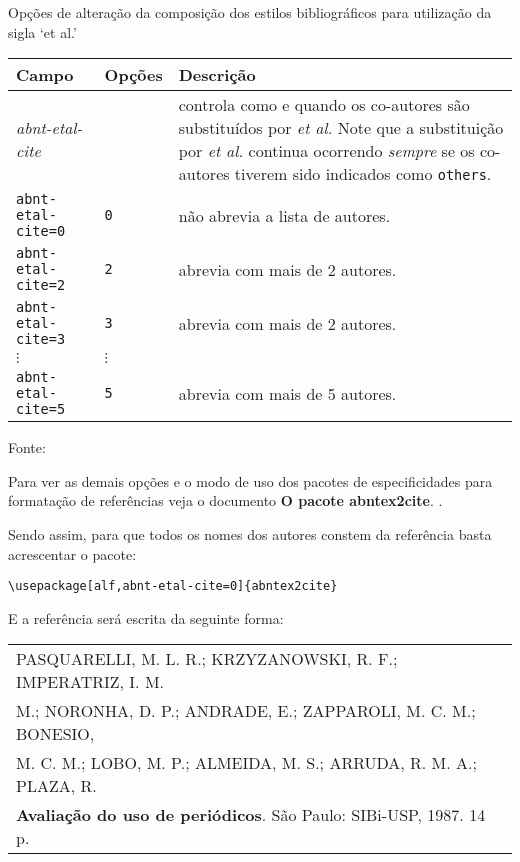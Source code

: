 \begin{quadro}[H]
	\caption{\label{quadro-opcoes-etal}Opções de alteração da composição dos estilos bibliogr\'aficos para utilização da sigla ‘et al.’}
		\begin{tabular}{|p{4.0cm}|p{2.0cm}|p{8.5cm}|}
			\hline
			\textbf{Campo} & \textbf{Opções} & \textbf{Descrição} \\ 
			\hline
			\emph{abnt-etal-cite} &  & controla como e quando os co-autores são
			substituídos por \emph{et al.}  Note que a substituição
			por \emph{et al.} continua ocorrendo \emph{sempre} se os co-autores tiverem sido indicados
			como \texttt{others}.\\
			\hline
			\texttt{abnt-etal-cite=0}&\texttt{0}& não abrevia a lista de autores.\\
			\hline
			\texttt{abnt-etal-cite=2}& \texttt{2} & abrevia com mais de 2 autores.\\
			\hline
			\texttt{abnt-etal-cite=3}& \texttt{3} & abrevia com mais de 2 autores.\\
			\hline
			$\vdots$ & $\vdots$ & \\
			\hline
			\texttt{abnt-etal-cite=5}& \texttt{5} & abrevia com mais de 5 autores.\\
			\hline
		\end{tabular}
	\begin{flushleft}
		Fonte: 
	\end{flushleft}	
\end{quadro}

Para ver as demais opções e o modo de uso dos pacotes de especificidades para formatação de refer\^encias veja o documento \textbf{O pacote abntex2cite}. \cite{abnetxcite}.

Sendo assim, para que todos os nomes dos autores constem da refer\^encia basta acrescentar o pacote: 

\verb+\usepackage[alf,abnt-etal-cite=0]{abntex2cite}+

E a refer\^encia ser\'a escrita da seguinte forma: \\

\begin{tabular}{|l|c|} \hline
PASQUARELLI, M. L. R.; KRZYZANOWSKI, R. F.; IMPERATRIZ, I. M.\\
M.; NORONHA, D. P.; ANDRADE, E.; ZAPPAROLI, M. C. M.; BONESIO, \\
M. C. M.; LOBO, M. P.; ALMEIDA, M. S.; ARRUDA, R. M. A.; PLAZA, R. \\ \textbf{Avaliação do uso de periódicos}. São Paulo: SIBi-USP, 1987. 14 p.\\\hline
\end{tabular}\\

